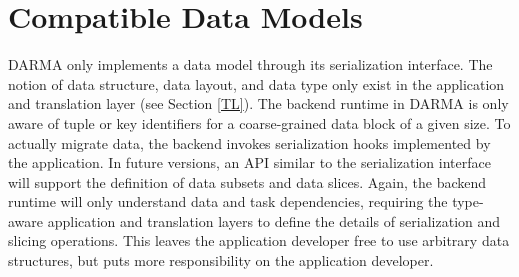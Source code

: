 
\section{Compatible Data Models}
\label{sec:data_model}
DARMA only implements a data model through its serialization interface.
The notion of data structure, data layout, and data type only exist in the application and translation layer (see Section \ref{TL}).
The backend runtime in DARMA is only aware of tuple or key identifiers for a coarse-grained data block of a given size.
To actually migrate data, the backend invokes serialization hooks implemented by the application.
In future versions, an API similar to the serialization interface will support the definition of data subsets and data slices.
Again, the backend runtime will only understand data and task dependencies, requiring the type-aware application and translation layers to define the details of serialization and slicing operations.
This leaves the application developer free to use arbitrary data structures, but puts more responsibility on the application developer.


